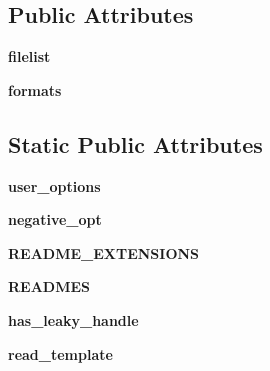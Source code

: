 \subsection*{Public Attributes}
\begin{DoxyCompactItemize}
\item 
\mbox{\label{classsetuptools_1_1command_1_1sdist_1_1sdist_a6a32cd8d6db51f0418ef5208afdb19bd}} 
{\bfseries filelist}
\item 
\mbox{\label{classsetuptools_1_1command_1_1sdist_1_1sdist_a248f0c606dc63eaaa199d3fe82fbfa51}} 
{\bfseries formats}
\end{DoxyCompactItemize}
\subsection*{Static Public Attributes}
\begin{DoxyCompactItemize}
\item 
\mbox{\label{classsetuptools_1_1command_1_1sdist_1_1sdist_a6269f2589afcdcde3d97d7c55cee2741}} 
{\bfseries user\+\_\+options}
\item 
\mbox{\label{classsetuptools_1_1command_1_1sdist_1_1sdist_ad9e145c49831cb911546e2194794c0db}} 
{\bfseries negative\+\_\+opt}
\item 
\mbox{\label{classsetuptools_1_1command_1_1sdist_1_1sdist_a130e367e9500d2de47ae127b03c8a009}} 
{\bfseries R\+E\+A\+D\+M\+E\+\_\+\+E\+X\+T\+E\+N\+S\+I\+O\+NS}
\item 
\mbox{\label{classsetuptools_1_1command_1_1sdist_1_1sdist_a53e578eef1ed5cc6ac88e5b999530886}} 
{\bfseries R\+E\+A\+D\+M\+ES}
\item 
\mbox{\label{classsetuptools_1_1command_1_1sdist_1_1sdist_a2704845c7e0c8bcdf6a20a60871214a5}} 
{\bfseries has\+\_\+leaky\+\_\+handle}
\item 
\mbox{\label{classsetuptools_1_1command_1_1sdist_1_1sdist_a706771d08f1f5e3c3310d5e8a78d519b}} 
{\bfseries read\+\_\+template}
\end{DoxyCompactItemize}


